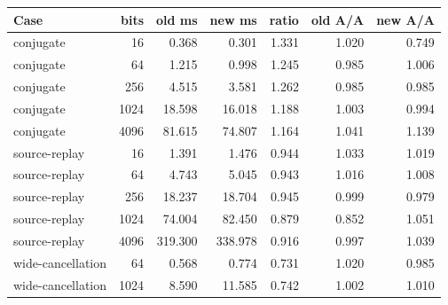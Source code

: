 \begin{center}\small
\begin{tabular}{@{}lrrrrrr@{}}
\toprule
Case & bits & old ms & new ms & ratio & old A/A & new A/A \\
\midrule
conjugate & 16 & 0.368 & 0.301 & 1.331 & 1.020 & 0.749 \\
conjugate & 64 & 1.215 & 0.998 & 1.245 & 0.985 & 1.006 \\
conjugate & 256 & 4.515 & 3.581 & 1.262 & 0.985 & 0.985 \\
conjugate & 1024 & 18.598 & 16.018 & 1.188 & 1.003 & 0.994 \\
conjugate & 4096 & 81.615 & 74.807 & 1.164 & 1.041 & 1.139 \\
source-replay & 16 & 1.391 & 1.476 & 0.944 & 1.033 & 1.019 \\
source-replay & 64 & 4.743 & 5.045 & 0.943 & 1.016 & 1.008 \\
source-replay & 256 & 18.237 & 18.704 & 0.945 & 0.999 & 0.979 \\
source-replay & 1024 & 74.004 & 82.450 & 0.879 & 0.852 & 1.051 \\
source-replay & 4096 & 319.300 & 338.978 & 0.916 & 0.997 & 1.039 \\
wide-cancellation & 64 & 0.568 & 0.774 & 0.731 & 1.020 & 0.985 \\
wide-cancellation & 1024 & 8.590 & 11.585 & 0.742 & 1.002 & 1.010 \\
\bottomrule
\end{tabular}
\end{center}
